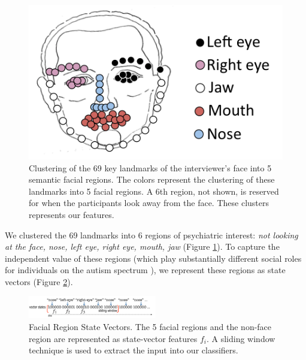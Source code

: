 \documentclass[10pt,twocolumn,letterpaper]{article}
\begin{document}
\begin{figure}[h]
    \begin{center}
        \includegraphics[width=0.5\linewidth]{figures/face2.png}
    \end{center}
    \caption{Clustering of the 69 key landmarks of the interviewer's face into 5 semantic facial regions. The colors represent the clustering of these landmarks into 5 facial regions. A 6th region, not shown, is reserved for when the participants look away from the face. These clusters represents our features.}
    \label{fig:feats}
\end{figure}

We clustered the 69 landmarks into 6 regions of psychiatric interest: \textit{not looking at the face, nose, left eye, right eye, mouth, jaw} (Figure \ref{fig:feats}). 
To capture the independent value of these regions (which play substantially different social roles for individuals on the autism spectrum \cite{klin2002}), we represent these regions as state vectors (Figure \ref{fig:statevectors}).


\begin{figure}[b]
        \centering
             \includegraphics[width=0.5\textwidth]{figures/vectors.png}
       \caption{Facial Region State Vectors. The 5 facial regions and the non-face region are represented as state-vector features $f_i$. A sliding window technique is used to extract the input into our classifiers.}
        \label{fig:statevectors}
\end{figure}
\end{document}
